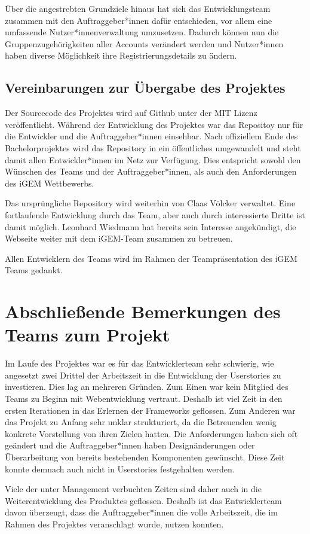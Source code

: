\documentclass[accentcolor=tud0b,12pt,paper=a4]{tudreport}
\begin{document}
	Über die angestrebten Grundziele hinaus hat sich das Entwicklungsteam zusammen mit den Auftraggeber*innen dafür entschieden, vor allem eine umfassende Nutzer*innenverwaltung umzusetzen. Dadurch können nun die Gruppenzugehörigkeiten aller Accounts verändert werden und Nutzer*innen haben diverse Möglichkeit ihre Registrierungsdetails zu ändern.

	\section{Vereinbarungen zur Übergabe des Projektes}
	Der Sourcecode des Projektes wird auf Github unter der MIT Lizenz veröffentlicht. Während der Entwicklung des Projektes war das  Repositoy nur für die Entwickler und die Auftraggeber*innen einsehbar. Nach offiziellem Ende des Bachelorprojektes wird das Repository in ein öffentliches umgewandelt und steht damit allen Entwickler*innen im Netz zur Verfügung. Dies entspricht sowohl den Wünschen des Teams und der Auftraggeber*innen, als auch den Anforderungen des iGEM Wettbewerbs.

	Das ursprüngliche Repository wird weiterhin von Claas Völcker verwaltet. Eine fortlaufende Entwicklung durch das Team, aber auch durch interessierte Dritte ist damit möglich. Leonhard Wiedmann hat bereits sein Interesse angekündigt, die Webseite weiter mit dem iGEM-Team zusammen zu betreuen.

	Allen Entwicklern des Teams wird im Rahmen der Teampräsentation des iGEM Teams gedankt.


\chapter{Abschließende Bemerkungen des Teams zum Projekt}
	Im Laufe des Projektes war es für das Entwicklerteam sehr schwierig, wie angesetzt zwei Drittel der Arbeitszeit in die Entwicklung der Userstories zu investieren. Dies lag an mehreren Gründen. Zum Einen war kein Mitglied des Teams zu Beginn mit Webentwicklung vertraut. Deshalb ist viel Zeit in den ersten Iterationen in das Erlernen der Frameworks geflossen. Zum Anderen war das Projekt zu Anfang sehr unklar strukturiert, da die Betreuenden wenig konkrete Vorstellung von ihren Zielen hatten. Die Anforderungen haben sich oft geändert und die Auftraggeber*innen haben Designänderungen oder Überarbeitung von bereits bestehenden Komponenten gewünscht. Diese Zeit konnte demnach auch nicht in Userstories festgehalten werden.
		
	Viele der unter Management verbuchten Zeiten sind daher auch in die Weiterentwicklung des Produktes geflossen. Deshalb ist das Entwicklerteam davon überzeugt, dass die Auftraggeber*innen die volle Arbeitszeit, die im Rahmen des Projektes veranschlagt wurde, nutzen konnten. 
	
\end{document}
